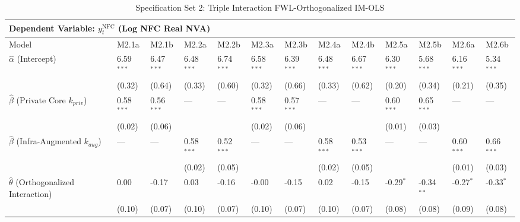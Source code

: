 \begin{table}[H]
\centering
\caption{Specification Set 2: Triple Interaction FWL-Orthogonalized IM-OLS}
\label{tab:spec_set_2}
\setlength{\tabcolsep}{2.5pt}
\scriptsize
\begin{tabular}{p{3.2cm}p{1.1cm}p{1.1cm}p{1.1cm}p{1.1cm}p{1.1cm}p{1.1cm}p{1.1cm}p{1.1cm}p{1.1cm}p{1.1cm}p{1.1cm}p{1.1cm}}
\toprule
\multicolumn{13}{l}{\textbf{Dependent Variable: $y_t^{\text{NFC}}$ (Log NFC Real NVA)}} \\
\midrule
Model & M2.1a & M2.1b & M2.2a & M2.2b & M2.3a & M2.3b & M2.4a & M2.4b & M2.5a & M2.5b & M2.6a & M2.6b  \\
\midrule
$\hat{\alpha}$ (Intercept)  & 6.59$^{***}$ & 6.47$^{***}$ & 6.48$^{***}$ & 6.74$^{***}$ & 6.58$^{***}$ & 6.39$^{***}$ & 6.48$^{***}$ & 6.67$^{***}$ & 6.30$^{***}$ & 5.68$^{***}$ & 6.16$^{***}$ & 5.34$^{***}$  \\
 & {\scriptsize (0.32)} & {\scriptsize (0.64)} & {\scriptsize (0.33)} & {\scriptsize (0.60)} & {\scriptsize (0.32)} & {\scriptsize (0.66)} & {\scriptsize (0.33)} & {\scriptsize (0.62)} & {\scriptsize (0.20)} & {\scriptsize (0.34)} & {\scriptsize (0.21)} & {\scriptsize (0.35)}  \\
$\hat{\beta}$ (Private Core $k_{priv}$)  & 0.58$^{***}$ & 0.56$^{***}$ & --- & --- & 0.58$^{***}$ & 0.57$^{***}$ & --- & --- & 0.60$^{***}$ & 0.65$^{***}$ & --- & ---  \\
 & {\scriptsize (0.02)} & {\scriptsize (0.06)} &  &  & {\scriptsize (0.02)} & {\scriptsize (0.06)} &  &  & {\scriptsize (0.01)} & {\scriptsize (0.03)} &  &   \\
$\hat{\beta}$ (Infra-Augmented $k_{aug}$)  & --- & --- & 0.58$^{***}$ & 0.52$^{***}$ & --- & --- & 0.58$^{***}$ & 0.53$^{***}$ & --- & --- & 0.60$^{***}$ & 0.66$^{***}$  \\
 &  &  & {\scriptsize (0.02)} & {\scriptsize (0.05)} &  &  & {\scriptsize (0.02)} & {\scriptsize (0.05)} &  &  & {\scriptsize (0.01)} & {\scriptsize (0.03)}  \\
$\hat{\theta}$ (Orthogonalized Interaction)  & 0.00 & -0.17 & 0.03 & -0.16 & -0.00 & -0.15 & 0.02 & -0.15 & -0.29$^{*}$ & -0.34$^{**}$ & -0.27$^{*}$ & -0.33$^{*}$  \\
 & {\scriptsize (0.10)} & {\scriptsize (0.07)} & {\scriptsize (0.10)} & {\scriptsize (0.07)} & {\scriptsize (0.10)} & {\scriptsize (0.07)} & {\scriptsize (0.10)} & {\scriptsize (0.07)} & {\scriptsize (0.08)} & {\scriptsize (0.08)} & {\scriptsize (0.09)} & {\scriptsize (0.08)}  \\

\end{tabular}
\end{table}
